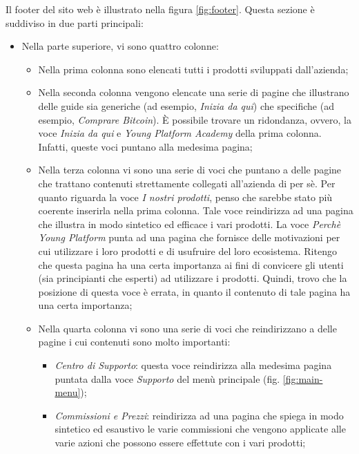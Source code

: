 Il footer del sito web è illustrato nella figura \ref{fig:footer}. Questa 
sezione è suddiviso in due parti principali:
\begin{itemize}
  \item Nella parte superiore, vi sono quattro colonne:
  \begin{itemize}
    \item Nella prima colonna sono elencati tutti i prodotti sviluppati 
    dall'azienda;

    \item Nella seconda colonna vengono elencate una serie di pagine che 
    illustrano delle guide sia generiche (ad esempio, 
    \textit{Inizia da qui}) che specifiche (ad esempio, 
    \textit{Comprare Bitcoin}). È possibile trovare un ridondanza, ovvero, 
    la voce \textit{Inizia da qui} e \textit{Young Platform Academy} della 
    prima colonna. Infatti, queste voci puntano alla medesima pagina;

    \item Nella terza colonna vi sono una serie di voci che puntano a delle 
    pagine che trattano contenuti strettamente collegati all'azienda di per 
    sè. Per quanto riguarda la voce \textit{I nostri prodotti}, penso che 
    sarebbe stato più coerente inserirla nella prima colonna. Tale voce 
    reindirizza ad una pagina che illustra in modo sintetico ed efficace 
    i vari prodotti. La voce \textit{Perchè Young Platform} punta ad una 
    pagina che fornisce delle motivazioni per cui utilizzare i loro 
    prodotti e di usufruire del loro ecosistema. Ritengo che questa pagina 
    ha una certa importanza ai fini di convicere gli utenti (sia principianti 
    che esperti) ad utilizzare i prodotti. Quindi, trovo che la posizione di 
    questa voce è errata, in quanto il contenuto di tale pagina ha una certa 
    importanza;

    \item Nella quarta colonna vi sono una serie di voci che reindirizzano a 
    delle pagine i cui contenuti sono molto importanti:
    \begin{itemize}
      \item \textit{Centro di Supporto}: questa voce reindirizza alla 
      medesima pagina puntata dalla voce \textit{Supporto} del menù 
      principale (fig. \ref{fig:main-menu});

      \item \textit{Commissioni e Prezzi}: reindirizza ad una pagina che 
      spiega in modo sintetico ed esaustivo le varie commissioni che 
      vengono applicate alle varie azioni che possono essere effettute con 
      i vari prodotti;


\end{itemize}
\end{itemize}
\end{itemize}
